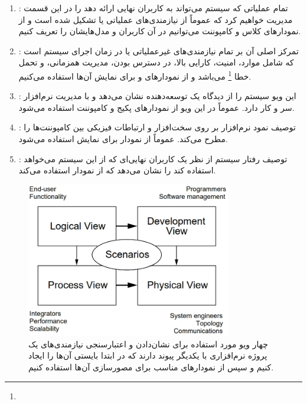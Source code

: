 \documentclass[a4paper]{article}
\begin{document}
\begin{enumerate}
    \item {}: تمام عملیاتی که سیستم می‌تواند به کاربران نهایی
    ارائه دهد را در این قسمت مدیریت خواهیم کرد که عموماً از نیازمندی‌های عملیاتی
    یا  تشکیل شده است و از نمودار‌های کلاس و
    کامپوننت می‌توانیم در آن کاربران و مدل‌هایشان را تعریف کنیم.
    \item {}: تمرکز اصلی آن بر تمام نیازمندی‌های غیرعملیاتی یا
     در زمان اجرای سیستم است که شامل موارد،
    امنیت، کارایی بالا، در دسترس بودن، مدیریت همزمانی، و تحمل خطا
    \footnote{} می‌باشد و از نمودار‌های  و
     برای نمایش آن‌ها استفاده می‌کنیم.
    \item {}: این ویو سیستم را از دیدگاه یک توسعه‌دهنده نشان
    می‌دهد و با مدیریت نرم‌افزار سر و کار دارد. عموماً در این ویو از نمودار‌های
    پکیج و کامپوننت استفاده می‌شود.
    \item {}: توصیف نمود نرم‌افزار بر روی سخت‌افزار و ارتباطات
    فیزیکی بین کامپوننت‌ها را مطرح می‌کند. عموماً از نمودار  برای
    نمایش استفاده می‌شود.
    \item {}: توصیف رفتار سیستم از نظر یک کاربران نهایی‌ای که از این
    سیستم می‌خواهد استفاده کند را نشان می‌دهد که از نمودار  استفاده
    می‌کند. 
\end{enumerate}

\begin{figure}[H]
    \centering
    \caption{چهار ویو مورد استفاده برای نشان‌دادن و اعتبارسنجی نیازمندی‌های یک
    پروژه نرم‌افزاری با یکدیگر پیوند دارند که در ابتدا بایستی آن‌ها را ایجاد
    کنیم و سپس از نمودار‌های مناسب برای مصور‌سازی آن‌ها استفاده کنیم.
    \cite{kruntchen1995architectural}}
    \includegraphics[width=0.8\textwidth]{diagrams/five_view.png}
\end{figure}
\end{document}
